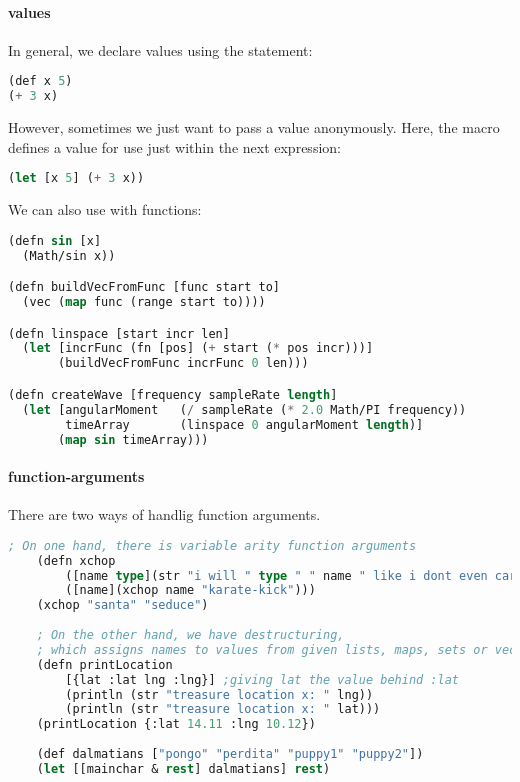 \paragraph{values} In general, we declare values using the  statement:
\begin{lstlisting}[language=lisp]
(def x 5)
(+ 3 x)
\end{lstlisting}
However, sometimes we just want to pass a value anonymously. Here, the  macro defines a value for use just within the next expression:
\begin{lstlisting}[language=lisp]
(let [x 5] (+ 3 x))
\end{lstlisting}

We can also use  with functions: 
\begin{lstlisting}[language=lisp]
(defn sin [x] 
  (Math/sin x))

(defn buildVecFromFunc [func start to]
  (vec (map func (range start to))))

(defn linspace [start incr len]
  (let [incrFunc (fn [pos] (+ start (* pos incr)))]
       (buildVecFromFunc incrFunc 0 len)))

(defn createWave [frequency sampleRate length]
  (let [angularMoment   (/ sampleRate (* 2.0 Math/PI frequency))
        timeArray       (linspace 0 angularMoment length)]
       (map sin timeArray)))
\end{lstlisting}

\paragraph{function-arguments} There are two ways of handlig function arguments.

\begin{lstlisting}[language=lisp]
    ; On one hand, there is variable arity function arguments
    (defn xchop
        ([name type](str "i will " type " " name " like i dont even care"))
        ([name](xchop name "karate-kick")))
    (xchop "santa" "seduce")
    
    ; On the other hand, we have destructuring, 
    ; which assigns names to values from given lists, maps, sets or vectors
    (defn printLocation 
        [{lat :lat lng :lng}] ;giving lat the value behind :lat
        (println (str "treasure location x: " lng))
        (println (str "treasure location x: " lat)))
    (printLocation {:lat 14.11 :lng 10.12})
    
    (def dalmatians ["pongo" "perdita" "puppy1" "puppy2"])
    (let [[mainchar & rest] dalmatians] rest)
\end{lstlisting}

